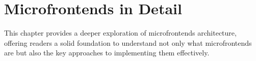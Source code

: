 \chapter{Microfrontends in Detail}
\label{chap:MicrofrontendsInDetail}
This chapter provides a deeper exploration of microfrontends architecture, offering readers a solid foundation to understand not only what microfrontends are but also the key approaches to implementing them effectively.


